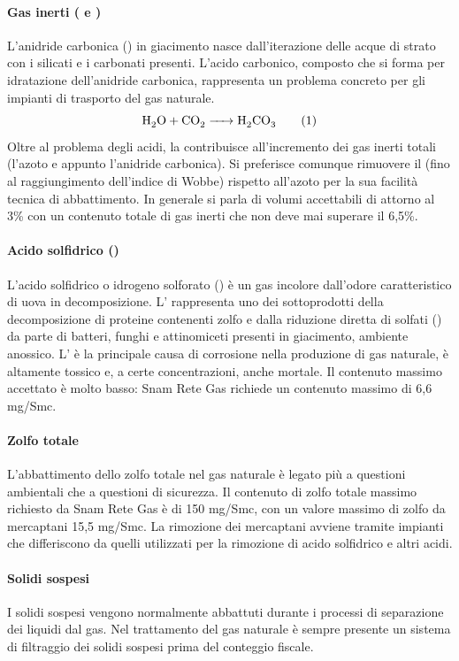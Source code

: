 \paragraph{Gas inerti ( e )}
L'anidride carbonica () in giacimento nasce dall'iterazione delle acque di strato con i silicati e i carbonati presenti. L'acido carbonico, composto che si forma per idratazione dell'anidride carbonica, rappresenta un problema concreto per gli impianti di trasporto del gas naturale.
\[\ce{H2O + CO2 -> H2CO3} \addtag \label{eq:acidocarbonico}\]
Oltre al problema degli acidi, la  contribuisce all'incremento dei gas inerti totali (l'azoto  e appunto l'anidride carbonica). Si preferisce comunque rimuovere il  (fino al raggiungimento dell'indice di Wobbe) rispetto all'azoto per la sua facilità tecnica di abbattimento. In generale si parla di volumi accettabili di  attorno al 3\% con un contenuto totale di gas inerti che non deve mai superare il 6,5\%.

\paragraph{Acido solfidrico ()}
L'acido solfidrico o idrogeno solforato () è un gas incolore dall'odore caratteristico di uova in decomposizione. L' rappresenta uno dei sottoprodotti della decomposizione di proteine contenenti zolfo e dalla riduzione diretta di solfati () da parte di batteri, funghi e attinomiceti presenti in giacimento, ambiente anossico. L' è la principale causa di corrosione nella produzione di gas naturale, è altamente tossico e, a certe concentrazioni, anche mortale. Il contenuto massimo accettato è molto basso: Snam Rete Gas richiede un contenuto massimo di 6,6 mg/Smc.

\paragraph{Zolfo totale}
L'abbattimento dello zolfo totale nel gas naturale è legato più a questioni ambientali che a questioni di sicurezza. Il contenuto di zolfo totale massimo richiesto da Snam Rete Gas è di 150 mg/Smc, con un valore massimo di zolfo da mercaptani 15,5 mg/Smc. La rimozione dei mercaptani avviene tramite impianti che differiscono da quelli utilizzati per la rimozione di acido solfidrico e altri acidi.

\paragraph{Solidi sospesi}
I solidi sospesi vengono normalmente abbattuti durante i processi di separazione dei liquidi dal gas. Nel trattamento del gas naturale è sempre presente un sistema di filtraggio dei solidi sospesi prima del conteggio fiscale.

